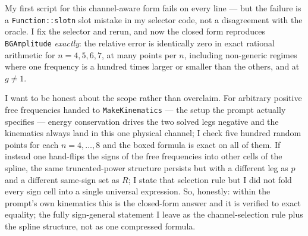 \documentclass{article}
\begin{document}
My first script for this channel-aware form fails on every line --- but the
failure is a \texttt{Function::slotn} slot mistake in my selector code, not a
disagreement with the oracle. I fix the selector and rerun, and now the closed
form reproduces \texttt{BGAmplitude} \emph{exactly}: the relative error is
identically zero in exact rational arithmetic for $n=4,5,6,7$, at many points per
$n$, including non-generic regimes where one frequency is a hundred times larger
or smaller than the others, and at $g\ne1$.

I want to be honest about the scope rather than overclaim. For arbitrary positive
free frequencies handed to \texttt{MakeKinematics} --- the setup the prompt
actually specifies --- energy conservation drives the two solved legs negative
and the kinematics always land in this one physical channel; I check five hundred
random points for each $n=4,\dots,8$ and the boxed formula is exact on all of
them. If instead one hand-flips the signs of the free frequencies into other
cells of the spline, the same truncated-power structure persists but with a
different leg as $p$ and a different same-sign set as $R$; I state that selection
rule but I did not fold every sign cell into a single universal expression. So,
honestly: within the prompt's own kinematics this is the closed-form answer and
it is verified to exact equality; the fully sign-general statement I leave as the
channel-selection rule plus the spline structure, not as one compressed formula.
\end{document}
